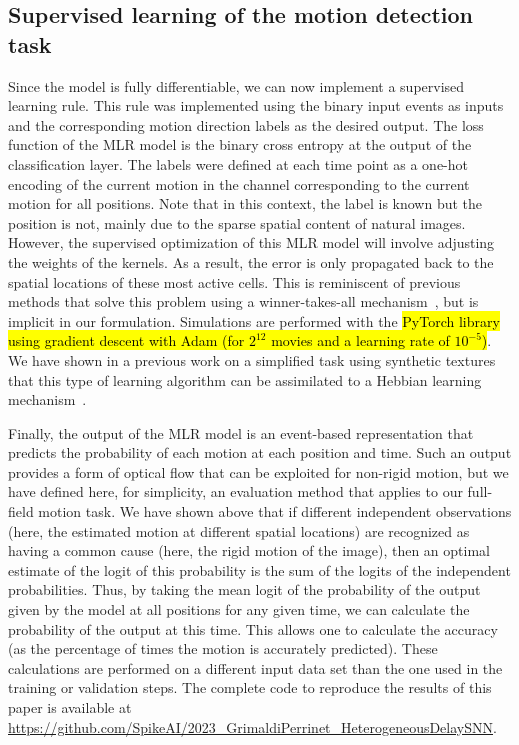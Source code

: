 \documentclass[default]{sn-jnl}%
\theoremstyle{thmstyleone}%
\theoremstyle{thmstyletwo}%
\theoremstyle{thmstylethree}%
\newcommand{\note}[1]{{\sethlcolor{yellow}\hl{#1}}}
\begin{document}
\subsection{Supervised learning of the motion detection task}
%
Since the model is fully differentiable, we can now implement a supervised learning rule. This rule was implemented using the binary input events as inputs and the corresponding motion direction labels as the desired output. The loss function of the MLR model is the binary cross entropy at the output of the classification layer. The labels were defined at each time point as a one-hot encoding of the current motion in the channel corresponding to the current motion for all positions. Note that in this context, the label is known but the position is not, mainly due to the sparse spatial content of natural images. However, the supervised optimization of this MLR model will involve adjusting the weights of the kernels. As a result, the error is only propagated back to the spatial locations of these most active cells. This is reminiscent of previous methods that solve this problem using a winner-takes-all mechanism~\citep{masquelier_unsupervised_2007}, but is implicit in our formulation. Simulations are performed with the \note{PyTorch library using gradient descent with Adam (for $2^{12}$ movies and a learning rate of $10^{-5}$)}. We have shown in a previous work on a simplified task using synthetic textures that this type of learning algorithm can be assimilated to a Hebbian learning mechanism~\cite{grimaldi_robust_2022}.

Finally, the output of the MLR model is an event-based representation that predicts the probability of each motion at each position and time. Such an output provides a form of optical flow that can be exploited for non-rigid motion, but we have defined here, for simplicity, an evaluation method that applies to our full-field motion task. We have shown above that if different independent observations (here, the estimated motion at different spatial locations) are recognized as having a common cause (here, the rigid motion of the image), then an optimal estimate of the logit of this probability is the sum of the logits of the independent probabilities. Thus, by taking the mean logit of the probability of the output given by the model at all positions for any given time, we can calculate the probability of the output at this time. This allows one to calculate the accuracy (as the percentage of times the motion is accurately predicted). These calculations are performed on a different input data set than the one used in the training or validation steps. The complete code to reproduce the results of this paper is available at \url{https://github.com/SpikeAI/2023_GrimaldiPerrinet_HeterogeneousDelaySNN}. %
%
\end{document}
